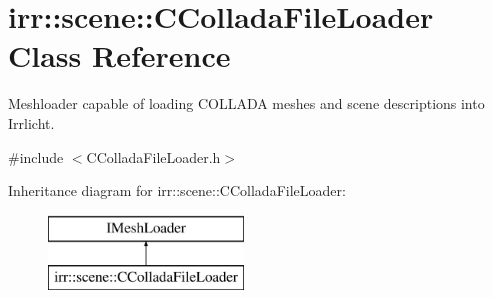 \hypertarget{classirr_1_1scene_1_1_c_collada_file_loader}{\section{irr\-:\-:scene\-:\-:C\-Collada\-File\-Loader Class Reference}
\label{classirr_1_1scene_1_1_c_collada_file_loader}
}


Meshloader capable of loading C\-O\-L\-L\-A\-D\-A meshes and scene descriptions into Irrlicht.  




{\ttfamily \#include $<$C\-Collada\-File\-Loader.\-h$>$}

Inheritance diagram for irr\-:\-:scene\-:\-:C\-Collada\-File\-Loader\-:\begin{figure}[H]
\begin{center}
\leavevmode
\includegraphics[height=2.000000cm]{classirr_1_1scene_1_1_c_collada_file_loader}
\end{center}
\end{figure}
